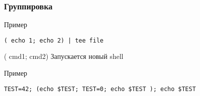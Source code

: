 \begin{frame}[fragile]
	\frametitle{Группировка}
	
	\begin{block}{Пример}
		\begin{lstlisting}
( echo 1; echo 2) | tee file
		\end{lstlisting}
	\end{block}

	\pause
	\begin{block}{( cmd1; cmd2)}
	    Запускается новый shell
	\end{block}

	\begin{block}{Пример}
		\begin{lstlisting}
TEST=42; (echo $TEST; TEST=0; echo $TEST ); echo $TEST
		\end{lstlisting}
	\end{block}

\end{frame}


